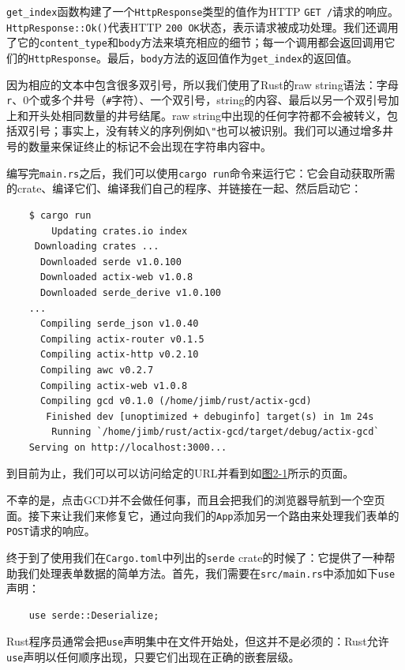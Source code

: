 \texttt{get\_index}函数构建了一个\texttt{HttpResponse}类型的值作为HTTP \texttt{GET /}请求的响应。\texttt{HttpResponse::Ok()}代表HTTP \texttt{200 OK}状态，表示请求被成功处理。我们还调用了它的\texttt{content\_type}和\texttt{body}方法来填充相应的细节；每一个调用都会返回调用它们的\texttt{HttpResponse}。最后，\texttt{body}方法的返回值作为\texttt{get\_index}的返回值。

因为相应的文本中包含很多双引号，所以我们使用了Rust的raw string语法：字母\texttt{r}、0个或多个井号（\texttt{\#}字符）、一个双引号，string的内容、最后以另一个双引号加上和开头处相同数量的井号结尾。raw string中出现的任何字符都不会被转义，包括双引号；事实上，没有转义的序列例如\texttt{\textbackslash"}也可以被识别。我们可以通过增多井号的数量来保证终止的标记不会出现在字符串内容中。

编写完\texttt{main.rs}之后，我们可以使用\texttt{cargo run}命令来运行它：它会自动获取所需的crate、编译它们、编译我们自己的程序、并链接在一起、然后启动它：
\begin{verbatim}
    $ cargo run
        Updating crates.io index
     Downloading crates ...
      Downloaded serde v1.0.100
      Downloaded actix-web v1.0.8
      Downloaded serde_derive v1.0.100
    ...
      Compiling serde_json v1.0.40
      Compiling actix-router v0.1.5
      Compiling actix-http v0.2.10
      Compiling awc v0.2.7
      Compiling actix-web v1.0.8
      Compiling gcd v0.1.0 (/home/jimb/rust/actix-gcd)
       Finished dev [unoptimized + debuginfo] target(s) in 1m 24s
        Running `/home/jimb/rust/actix-gcd/target/debug/actix-gcd`
    Serving on http://localhost:3000...
\end{verbatim}

到目前为止，我们可以可以访问给定的URL并看到如\hyperref[f2-1]{图2-1}所示的页面。

不幸的是，点击GCD并不会做任何事，而且会把我们的浏览器导航到一个空页面。接下来让我们来修复它，通过向我们的\texttt{App}添加另一个路由来处理我们表单的\texttt{POST}请求的响应。

终于到了使用我们在\texttt{Cargo.toml}中列出的\texttt{serde} crate的时候了：它提供了一种帮助我们处理表单数据的简单方法。首先，我们需要在\texttt{src/main.rs}中添加如下\texttt{use}声明：
\begin{verbatim}
    use serde::Deserialize;
\end{verbatim}

Rust程序员通常会把\texttt{use}声明集中在文件开始处，但这并不是必须的：Rust允许\texttt{use}声明以任何顺序出现，只要它们出现在正确的嵌套层级。

